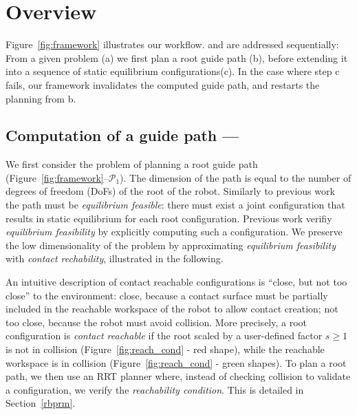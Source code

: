\section{Overview}
\label{overview}


Figure~\ref{fig:framework} illustrates our workflow.
\Pa and \Pb are addressed sequentially: From a given problem (a) we first plan a root guide path (b), before
extending it into a sequence of static equilibrium configurations(c). In the case where step c fails,
our framework invalidates the computed guide path, and restarts the planning from b.

%

\subsection{Computation of a guide path --- \Pa}
We first consider the problem of planning a root guide path (Figure~\ref{fig:framework}--$\mathcal{P}_1$).  The dimension of the path is equal to the number of degrees of freedom (DoFs) of the root of the robot.
Similarly to previous work~\citep{Bouyarmane2009} the path must be \textit{equilibrium feasible}: there must exist a joint configuration that results in static equilibrium for each root configuration. Previous work verifiy \textit{equilibrium feasibility} by explicitly computing such a configuration. 
We preserve the low dimensionality of the problem by approximating \textit{equilibrium feasibility} with \textit{contact rechability}, illustrated in the following.

An intuitive description of \gls{contact reachable} configurations is ``close, but not too close'' to the environment: close, because a contact surface must be partially included in the reachable workspace of the robot to allow contact creation; not too close, because the robot must avoid collision.
More precisely, a root configuration is \textit{contact reachable} if the root scaled by a user-defined factor $s \geq 1$ is not in collision (Figure~\ref{fig:reach_cond} - red shape), while the reachable workspace is in collision (Figure~\ref{fig:reach_cond} - green shapes).
To plan a root path, we then use an RRT planner where, instead of checking collision to validate a configuration, we verify the \textit{reachability condition}.
This is detailed in Section~\ref{rbprm}.


